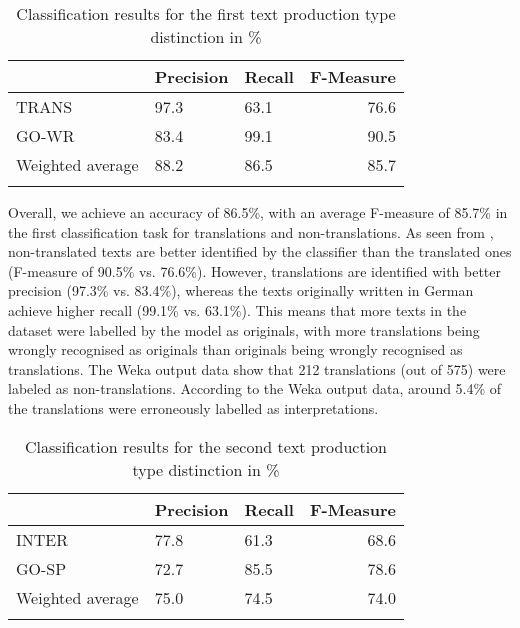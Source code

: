 \documentclass[output=paper,colorlinks,citecolor=brown]{langscibook}
\begin{document}
\begin{table}
    \centering
    \begin{tabularx}{\textwidth}{XYYr}
\lsptoprule
 &\bf Precision & \bf Recall & \bf F-Measure\\
\midrule
TRANS &   97.3   &  63.1  &    76.6    \\  
GO-WR &   83.4  &   99.1  &   90.5    \\
Weighted average & 88.2 &  86.5 & 85.7 \\
\lspbottomrule
    \end{tabularx}
    \caption{Classification results for the first text production type distinction in \%}
    \label{tab:rq1-1}
\end{table}

   
Overall, we achieve an accuracy of 86.5\%, with an average F-measure of 85.7\% in the first classification task for translations and non-translations. As seen from , non-translated texts are better identified by the classifier than the translated ones (F-measure of 90.5\% vs. 76.6\%). However, translations are identified with better precision (97.3\% vs. 83.4\%), whereas the texts originally written in German achieve higher recall (99.1\% vs. 63.1\%).  This means that more texts in the dataset were labelled by the model as originals, with more translations being wrongly recognised as originals than originals being wrongly recognised as translations. The Weka output data show that 212 translations (out of 575) were labeled as non-translations. According to the Weka output data, around 5.4\% of the translations were erroneously labelled as interpretations.


 \begin{table}[b]
    \begin{tabularx}{\textwidth}{XYYr}
\lsptoprule
 &\bf Precision & \bf Recall & \bf F-Measure\\
\midrule
INTER &    77.8   &  61.3   &  68.6    \\    
GO-SP   &    72.7   &  85.5   &  78.6   \\
Weighted average & 75.0 & 74.5 & 74.0 \\
 \lspbottomrule
    \end{tabularx}
    \caption{Classification results for the second text production type distinction in \%}
    \label{tab:rq1-2}
\end{table}
\end{document}
